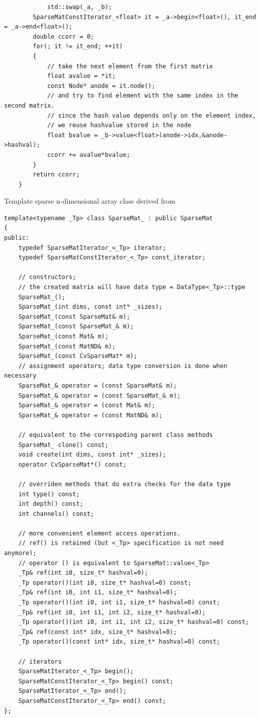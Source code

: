 \begin{enumerate}
\begin{lstlisting}
            std::swap(_a, _b);
        SparseMatConstIterator_<float> it = _a->begin<float>(), it_end = _a->end<float>();
        double ccorr = 0;
        for(; it != it_end; ++it)
        {
            // take the next element from the first matrix
            float avalue = *it;
            const Node* anode = it.node();
            // and try to find element with the same index in the second matrix.
            // since the hash value depends only on the element index,
            // we reuse hashvalue stored in the node
            float bvalue = _b->value<float>(anode->idx,&anode->hashval);
            ccorr += avalue*bvalue;
        }
        return ccorr;
    }
    \end{lstlisting}
\end{enumerate}

Template sparse n-dimensional array class derived from 

\begin{lstlisting}
template<typename _Tp> class SparseMat_ : public SparseMat
{
public:
    typedef SparseMatIterator_<_Tp> iterator;
    typedef SparseMatConstIterator_<_Tp> const_iterator;

    // constructors;
    // the created matrix will have data type = DataType<_Tp>::type
    SparseMat_();
    SparseMat_(int dims, const int* _sizes);
    SparseMat_(const SparseMat& m);
    SparseMat_(const SparseMat_& m);
    SparseMat_(const Mat& m);
    SparseMat_(const MatND& m);
    SparseMat_(const CvSparseMat* m);
    // assignment operators; data type conversion is done when necessary
    SparseMat_& operator = (const SparseMat& m);
    SparseMat_& operator = (const SparseMat_& m);
    SparseMat_& operator = (const Mat& m);
    SparseMat_& operator = (const MatND& m);

    // equivalent to the correspoding parent class methods
    SparseMat_ clone() const;
    void create(int dims, const int* _sizes);
    operator CvSparseMat*() const;

    // overriden methods that do extra checks for the data type
    int type() const;
    int depth() const;
    int channels() const;
    
    // more convenient element access operations.
    // ref() is retained (but <_Tp> specification is not need anymore);
    // operator () is equivalent to SparseMat::value<_Tp>
    _Tp& ref(int i0, size_t* hashval=0);
    _Tp operator()(int i0, size_t* hashval=0) const;
    _Tp& ref(int i0, int i1, size_t* hashval=0);
    _Tp operator()(int i0, int i1, size_t* hashval=0) const;
    _Tp& ref(int i0, int i1, int i2, size_t* hashval=0);
    _Tp operator()(int i0, int i1, int i2, size_t* hashval=0) const;
    _Tp& ref(const int* idx, size_t* hashval=0);
    _Tp operator()(const int* idx, size_t* hashval=0) const;

    // iterators
    SparseMatIterator_<_Tp> begin();
    SparseMatConstIterator_<_Tp> begin() const;
    SparseMatIterator_<_Tp> end();
    SparseMatConstIterator_<_Tp> end() const;
};
\end{lstlisting}


